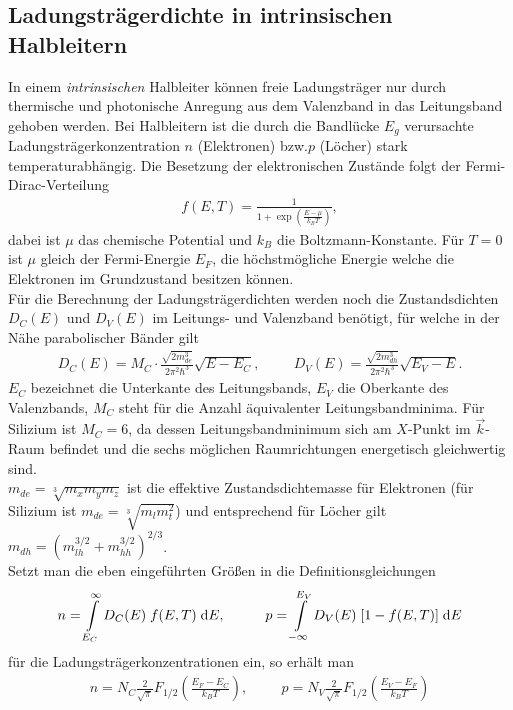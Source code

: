 \subsection{Ladungsträgerdichte in intrinsischen Halbleitern}
In einem \emph{intrinsischen} Halbleiter können freie Ladungsträger nur durch thermische und photonische Anregung aus dem Valenzband in das Leitungsband gehoben werden. Bei Halbleitern ist die durch die Bandlücke $E_g$ verursachte Ladungsträgerkonzentration $n$ (Elektronen) bzw.$p$ (Löcher) stark temperaturabhängig.
Die Besetzung der elektronischen Zustände folgt der Fermi-Dirac-Verteilung
\begin{align}
f(E,T)=\frac{1}{1+\exp\left(\frac{E-\mu}{k_B T}\right)},
\end{align}
dabei ist $\mu$ das chemische Potential und $k_B$ die Boltzmann-Konstante. Für $T=0$ ist $\mu$ gleich der Fermi-Energie $E_F$, die höchstmögliche Energie welche die Elektronen im Grundzustand besitzen können.\\
Für die Berechnung der Ladungsträgerdichten werden noch die Zustandsdichten $D_C(E)$ und $D_V(E)$ im Leitungs- und Valenzband benötigt, für welche in der Nähe parabolischer Bänder gilt
\begin{align}
D_C(E)=M_C\cdot \frac{\sqrt{2m_{de}^3}}{2\pi^2\hbar^3}\sqrt{E-E_C},\hspace{1cm}
D_V(E)=\frac{\sqrt{2m_{dh}^3}}{2\pi^2\hbar^3}\sqrt{E_V-E}.
\end{align}
$E_C$ bezeichnet die Unterkante des Leitungsbands, $E_V$ die Oberkante des Valenzbands, $M_C$ steht für die Anzahl äquivalenter Leitungsbandminima. Für Silizium ist $M_C=6$, da dessen Leitungsbandminimum sich am $X$-Punkt im $\vec{k}$-Raum befindet und die sechs möglichen Raumrichtungen energetisch gleichwertig sind.\\
$m_{de}=\sqrt[3]{m_x m_y m_z}$ ist die effektive Zustandsdichtemasse für Elektronen (für Silizium ist $m_{de}=\sqrt[3]{m_l m_t^2}$) und entsprechend für Löcher gilt $m_{dh}=(m_{lh}^{3/2}+m_{hh}^{3/2})^{2/3}$.\\
Setzt man die eben eingeführten Größen in die Definitionsgleichungen 
\begin{align}
n=\int\limits_{E_C}^\infty D_C(E)\;f(E,T)\;\mathrm{d} E,\hspace{1cm}
p=\int\limits_{-\infty}^{E_V} D_V(E)\;[1-f(E,T)]\;\mathrm{d} E
\end{align}
für die Ladungsträgerkonzentrationen ein, so erhält man
\begin{align}
n=N_C\frac{2}{\sqrt{\pi}}F_{1/2}\left(\frac{E_F-E_C}{k_B T}\right),\hspace{1cm}p=N_V\frac{2}{\sqrt{\pi}}F_{1/2}\left(\frac{E_V-E_F}{k_B T}\right)
\label{eq:density1}
\end{align}
